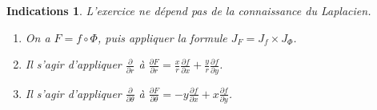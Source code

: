 \documentclass[11pt,a4paper]{article}
\theoremstyle{exostyle}
\newtheorem{ind}{Indications}
\newcommand{\indication}{\begin{ind}} \newcommand{\finindication}{\end{ind}}
\begin{document}
\finenonce

\indication
L'exercice ne dépend pas de la connaissance du Laplacien.
\begin{enumerate}
	\item On a $F = f \circ \Phi$, puis appliquer la formule \og{}$J_F = J_f \times J_\Phi$\fg{}.
	
	\item Il s'agir d’appliquer $\frac{\partial}{\partial r}$ à $\frac{\partial F}{\partial r} = \frac xr\frac{\partial f}{\partial x}+ \frac yr\frac{\partial f}{\partial y}$.
	
	\item Il s'agir d’appliquer $\frac{\partial}{\partial \theta}$ à $\frac{\partial F}{\partial \theta} = -y \frac{\partial f}{\partial x}+x\frac{\partial f}{\partial y}$.
\end{enumerate}

\finindication
\end{document}
